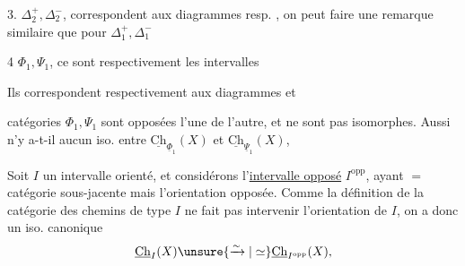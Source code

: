 
3. $\mathbb{\Delta}_2^+,\mathbb{\Delta}_2^-$, correspondent aux diagrammes
resp.\quad {}
,
on peut faire une remarque similaire que pour $\mathbb{\Delta}_1^+,\mathbb{\Delta}_1^-$

4 $\Phi_1,\Psi_1$, ce sont respectivement les intervalles

 Ils correspondent respectivement aux diagrammes
et

 catégories $\Phi_1,\Psi_1$ sont  opposées l'une de l'autre, et ne sont pas isomorphes. Aussi n'y a-t-il  aucun iso. entre $\underline{\mathrm{Ch}}_{\underline{\Phi}_1}(X)$ et $\underline{\mathrm{Ch}}_{\underline{\Psi}_1}(X)$,

Soit $I$ un intervalle orienté, et considérons l'\uline{intervalle opposé} $I^{\mathrm{opp}}$, ayant $=$ catégorie sous-jacente mais l'orientation opposée.  Comme la définition de la  catégorie des chemins de type $I$ ne fait pas intervenir l'orientation de $I$, on a donc un iso. canonique
\[ \underline{\mathrm{Ch}}_I(X) \unsure{\xrightarrow{\sim}|\simeq} \underline{\mathrm{Ch}}_{I^{\mathrm{opp}}}(X), \]
